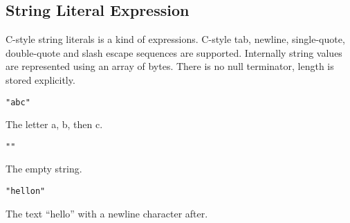 
\subsection{String Literal Expression}
{
	C-style string literals is a kind of expressions.
	C-style tab, newline, single-quote, double-quote and slash escape sequences
	are supported. Internally string values are represented using an array of
	bytes. There is no null terminator, length is stored explicitly.
	
	\begin{itemize}
	{
		\item[] \texttt{"abc"}
		
			The letter a, b, then c.
		
		\item[] \texttt{""}
		
			The empty string.
		
		\item[] \texttt{"hellon"}
		
			The text ``hello'' with a newline
			character after.
	}
	\end{itemize}
}
